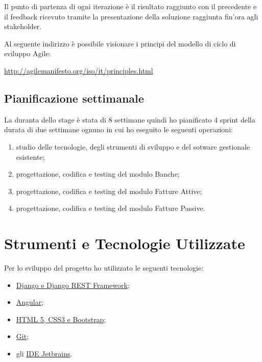 	Il punto di partenza di ogni iterazione è il risultato raggiunto con il precedente e il feedback
	ricevuto tramite la presentazione della soluzione raggiunta fin’ora agli stakeholder.
	
	Al seguente indirizzo è possibile visionare i principi del modello di ciclo di sviluppo
	Agile:
		\begin{center}
		\url{http://agilemanifesto.org/iso/it/principles.html}
		\end{center}
	
	\subsection{Pianificazione settimanale}
	La duranta dello stage è stata di 8 settimane quindi ho pianificato 4 sprint della durata di due settimane ognuno in cui ho eseguito le seguenti operazioni:
	\begin{enumerate}
		\item studio delle tecnologie, degli strumenti di sviluppo e del sotware gestionale esistente;
		\item progettazione, codifica e testing del modulo Banche;
		\item progettazione, codifica e testing del modulo Fatture Attive;
		\item progettazione, codifica e testing del modulo Fatture Passive.
	\end{enumerate}

%


\section{Strumenti e Tecnologie Utilizzate}
	Per lo sviluppo del progetto ho utilizzato le seguenti tecnologie:
		\begin{itemize}
			\item \hyperref[tec:django]{Django e Django REST Framework};
			\item \hyperref[tec:angular]{Angular};
			\item \hyperref[tec:web]{HTML 5, CSS3 e Bootstrap};
			\item \hyperref[tec:git]{Git};
			\item  gli \hyperref[tec:intellij]{IDE Jetbrains}.
		\end{itemize}
	
